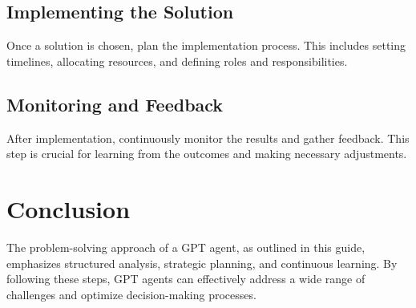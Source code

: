 \documentclass{article}
\begin{document}
\subsection{Implementing the Solution}
Once a solution is chosen, plan the implementation process. This includes setting timelines, allocating resources, and defining roles and responsibilities.

\subsection{Monitoring and Feedback}
After implementation, continuously monitor the results and gather feedback. This step is crucial for learning from the outcomes and making necessary adjustments.

\section{Conclusion}
The problem-solving approach of a GPT agent, as outlined in this guide, emphasizes structured analysis, strategic planning, and continuous learning. By following these steps, GPT agents can effectively address a wide range of challenges and optimize decision-making processes.
\end{document}
